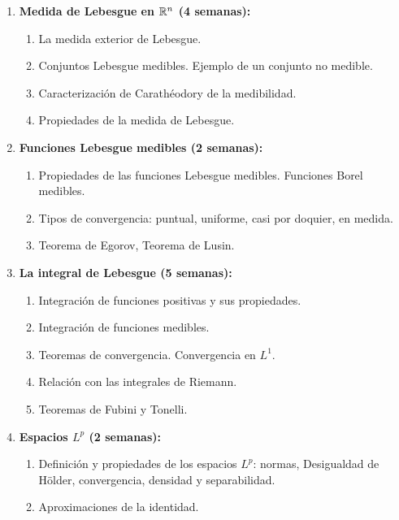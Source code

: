 \begin{refsection}
\begin{enumerate}
\item \textbf{Medida de Lebesgue en $\mathbb{R}^n$ (4 semanas):} 

\begin{enumerate}
    \item La medida exterior de Lebesgue.
    \item Conjuntos Lebesgue medibles. Ejemplo de un conjunto no medible.
    \item Caracterización de Carathéodory de la medibilidad.
    \item Propiedades de la medida de Lebesgue.
\end{enumerate}

\item \textbf{Funciones Lebesgue medibles (2 semanas):} 
\begin{enumerate}
    \item Propiedades de las funciones Lebesgue medibles. Funciones Borel medibles.
    \item Tipos de convergencia: puntual, uniforme, casi por doquier, en medida.
    \item Teorema de Egorov, Teorema de Lusin.
\end{enumerate}


\item \textbf{La integral de Lebesgue (5 semanas):} 
\begin{enumerate}
    \item Integración de funciones positivas y sus propiedades.
    \item Integración de funciones medibles.
    \item Teoremas de convergencia. Convergencia en $L^1$.
    \item Relación con las integrales de Riemann.
    \item Teoremas de Fubini y Tonelli.
\end{enumerate}

\item \textbf{Espacios $L^p$ (2 semanas):} 
\begin{enumerate}
    \item Definición y propiedades de los espacios $L^p$: normas, Desigualdad de Hölder, convergencia, densidad y separabilidad.
    \item Aproximaciones de la identidad.
\end{enumerate}


\end{enumerate}
\end{refsection}
